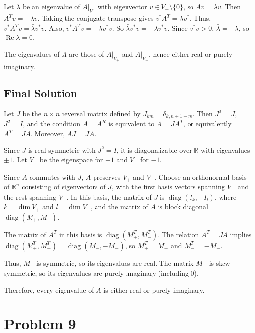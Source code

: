 \documentclass[12pt,a4paper]{article}
\theoremstyle{definition}
\begin{document}
    Let $\lambda$ be an eigenvalue of $A|_{V_-}$ with eigenvector $v \in V_- \setminus \{0\}$, so $A v = \lambda v$. Then $A^T v = -\lambda v$. Taking the conjugate transpose gives $v^* A^T = \bar{\lambda} v^*$. Thus, $v^* A^T v = \bar{\lambda} v^* v$. Also, $v^* A^T v = -\lambda v^* v$. So $\bar{\lambda} v^* v = -\lambda v^* v$. Since $v^* v > 0$, $\bar{\lambda} = -\lambda$, so $\operatorname{Re} \lambda = 0$.

    The eigenvalues of $A$ are those of $A|_{V_+}$ and $A|_{V_-}$, hence either real or purely imaginary.

\subsection{Final Solution}
    Let $J$ be the $n \times n$ reversal matrix defined by $J_{k m} = \delta_{k, n+1-m}$. Then $J^T = J$, $J^2 = I$, and the condition $A = A^R$ is equivalent to $A = J A^T$, or equivalently $A^T = J A$. Moreover, $A J = J A$.

    Since $J$ is real symmetric with $J^2 = I$, it is diagonalizable over $\mathbb{R}$ with eigenvalues $\pm 1$. Let $V_+$ be the eigenspace for $+1$ and $V_-$ for $-1$.

    Since $A$ commutes with $J$, $A$ preserves $V_+$ and $V_-$. Choose an orthonormal basis of $\mathbb{R}^n$ consisting of eigenvectors of $J$, with the first basis vectors spanning $V_+$ and the rest spanning $V_-$. In this basis, the matrix of $J$ is $\operatorname{diag}(I_k, -I_l)$, where $k = \dim V_+$ and $l = \dim V_-$, and the matrix of $A$ is block diagonal $\operatorname{diag}(M_+, M_-)$.

    The matrix of $A^T$ in this basis is $\operatorname{diag}(M_+^T, M_-^T)$. The relation $A^T = J A$ implies $\operatorname{diag}(M_+^T, M_-^T) = \operatorname{diag}(M_+, -M_-)$, so $M_+^T = M_+$ and $M_-^T = -M_-$.

    Thus, $M_+$ is symmetric, so its eigenvalues are real. The matrix $M_-$ is skew-symmetric, so its eigenvalues are purely imaginary (including 0).

    Therefore, every eigenvalue of $A$ is either real or purely imaginary.

  \section{Problem 9}
\end{document}
